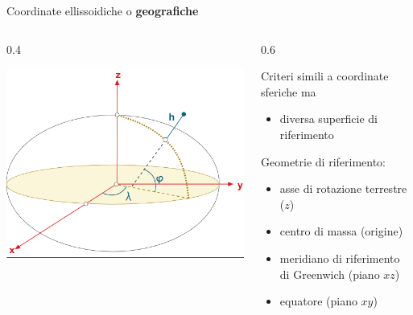 \documentclass{beamer}
\begin{document}
{\begin{frame}
   Coordinate ellissoidiche o \textbf{geografiche}

    \begin{columns}	
          \begin{column} {0.4\textwidth}
          \begin{center}
              \includegraphics[width=\textwidth] {./pics_2022_03/Cartesian_Ellipsoid_Coord_coorenu.png}	
          \end{center}
          
      \end{column}
      \begin{column} {0.6\textwidth}
      
          Criteri simili a coordinate sferiche ma
          \begin{itemize}
              \item diversa superficie di riferimento
          \end{itemize}
          
          Geometrie di riferimento:
          \begin{itemize}
              \item asse di rotazione terrestre ($z$)
              \item centro di massa (origine)
              \item meridiano di riferimento di Greenwich (piano $xz$)
              \item equatore (piano $xy$)
          \end{itemize}
          

\end{column}
\end{columns}
\end{frame}}
\end{document}
